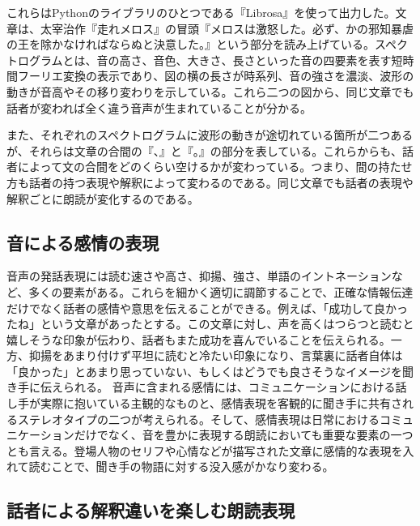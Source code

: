 これらはPythonのライブラリのひとつである『Librosa\cite{librosa}』を使って出力した。文章は、太宰治作『走れメロス\cite{Dazai}』の冒頭『メロスは激怒した。必ず、かの邪知暴虐の王を除かなければならぬと決意した。』という部分を読み上げている。スペクトログラムとは、音の高さ、音色、大きさ、長さといった音の四要素を表す短時間フーリエ変換の表示であり、図の横の長さが時系列、音の強さを濃淡、波形の動きが音高やその移り変わりを示している。これら二つの図から、同じ文章でも話者が変われば全く違う音声が生まれていることが分かる。

また、それぞれのスペクトログラムに波形の動きが途切れている箇所が二つあるが、それらは文章の合間の『、』と『。』の部分を表している。これらからも、話者によって文の合間をどのくらい空けるかが変わっている。つまり、間の持たせ方も話者の持つ表現や解釈によって変わるのである。同じ文章でも話者の表現や解釈ごとに朗読が変化するのである。


\subsection{音による感情の表現}
音声の発話表現には読む速さや高さ、抑揚、強さ、単語のイントネーションなど、多くの要素がある。これらを細かく適切に調節することで、正確な情報伝達だけでなく話者の感情や意思を伝えることができる。例えば、「成功して良かったね」という文章があったとする。この文章に対し、声を高くはつらつと読むと嬉しそうな印象が伝わり、話者もまた成功を喜んでいることを伝えられる。一方、抑揚をあまり付けず平坦に読むと冷たい印象になり、言葉裏に話者自体は「良かった」とあまり思っていない、もしくはどうでも良さそうなイメージを聞き手に伝えられる。
音声に含まれる感情には、コミュニケーションにおける話し手が実際に抱いている主観的なものと、感情表現を客観的に聞き手に共有されるステレオタイプの二つが考えられる\cite{sutereo}。そして、感情表現は日常におけるコミュニケーションだけでなく、音を豊かに表現する朗読においても重要な要素の一つとも言える。登場人物のセリフや心情などが描写された文章に感情的な表現を入れて読むことで、聞き手の物語に対する没入感がかなり変わる。





\subsection{話者による解釈違いを楽しむ朗読表現}\label{kaishaku}

